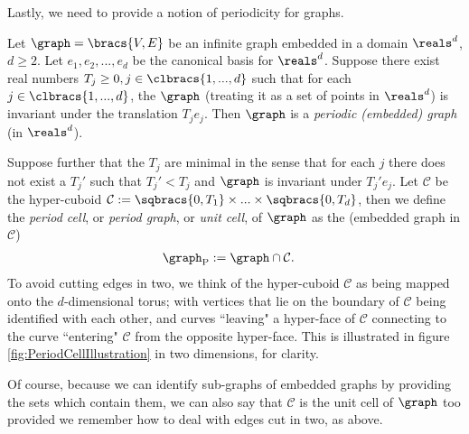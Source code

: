 Lastly, we need to provide a notion of periodicity for graphs.
\begin{definition} \label{def:PeriodicGraph}
	Let $\graph=\bracs{V,E}$ be an infinite graph embedded in a domain $\reals^d$, $d\geq2$.
	Let $e_1, e_2, ..., e_d$ be the canonical basis for $\reals^d$.
	Suppose there exist real numbers $T_{j}\geq0, j\in\clbracs{1,...,d}$ such that for each $j\in\clbracs{1,...,d}$, the $\graph$ (treating it as a set of points in $\reals^d$) is invariant under the translation $T_j e_j$.
	Then $\graph$ is a \textit{periodic (embedded) graph} (in $\reals^d$). \newline
	
	Suppose further that the $T_j$ are minimal in the sense that for each $j$ there does not exist a $T_j'$ such that $T_j'<T_j$ and $\graph$ is invariant under $T_j' e_j$.
	Let $\mathcal{C}$ be the hyper-cuboid $\mathcal{C}:= \sqbracs{0,T_1}\times ... \times\sqbracs{0,T_d}$, then we define the \textit{period cell}, or \textit{period graph}, or \textit{unit cell}, of $\graph$ as the (embedded graph in $\mathcal{C}$)
	\begin{align*}
		\graph_{\mathrm{P}} &:= \graph \cap \mathcal{C}.
	\end{align*}
	To avoid cutting edges in two, we think of the hyper-cuboid $\mathcal{C}$ as being mapped onto the $d$-dimensional torus; with vertices that lie on the boundary of $\mathcal{C}$ being identified with each other, and curves ``leaving" a hyper-face of $\mathcal{C}$ connecting to the curve ``entering"  $\mathcal{C}$ from the opposite hyper-face.
	This is illustrated in figure \ref{fig:PeriodCellIllustration} in two dimensions, for clarity.
	
	Of course, because we can identify sub-graphs of embedded graphs by providing the sets which contain them, we can also say that $\mathcal{C}$ is the unit cell of $\graph$ too provided we remember how to deal with edges cut in two, as above.
\end{definition}
